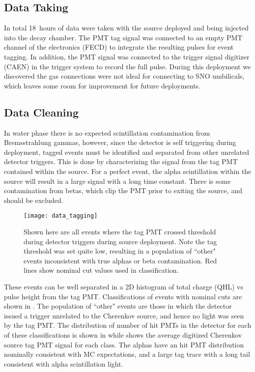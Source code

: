 \subsection{Data Taking}
In total 18~hours of data were taken with the source deployed and \Li being injected into the decay chamber.
The PMT tag signal was connected to an empty PMT channel of the {\snop} electronics (FECD) to integrate the resulting pulses for event tagging.
In addition, the PMT signal was connected to the trigger signal digitizer (CAEN) in the {\snop} trigger system to record the full pulse.
During this deployment we discovered the gas connections were not ideal for connecting to SNO umbilicals, which leaves some room for improvement for future deployments.

\subsection{Data Cleaning}
In water phase there is no expected scintillation contamination from Bremsstrahlung gammas, however, since the detector is self triggering during deployment, tagged events must be identified and separated from other unrelated detector triggers.
This is done by characterizing the signal from the tag PMT contained within the source.
For a perfect event, the alpha scintillation within the source will result in a large signal with a long time constant.
There is some contamination from \Li betas, which clip the PMT prior to exiting the source, and should be excluded.


\begin{figure}
\centering
\texttt{[image: data\_tagging]}
\caption{\label{fig:chsrc_classify} Shown here are all events where the tag PMT crossed threshold during detector triggers during source deployment. Note the tag threshold was set quite low, resulting in a population of ``other" events inconsistent with true alphas or beta contamination. Red lines show nominal cut values used in classification.}
\end{figure}

These events can be well separated in a 2D histogram of total charge (QHL) vs pulse height from the tag PMT. 
Classifications of events with nominal cuts are shown in .
The population of ``other" events are those in which the detector issued a trigger unrelated to the Cherenkov source, and hence no light was seen by the tag PMT.
The distribution of number of hit PMTs in the {\snop} detector for each of these classifications is shown in  while  shows the average digitized Cherenkov source tag PMT signal for each class.
The alphas have an hit PMT distribution nominally consistent with MC expectations, and a large tag trace with a long tail consistent with alpha scintillation light.


